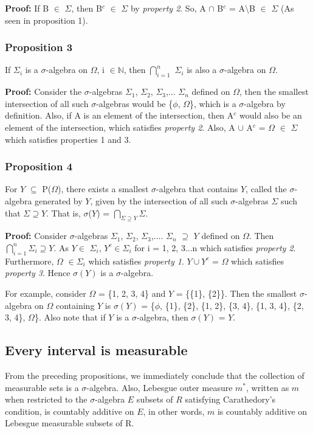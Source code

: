 \documentclass{article}
\begin{document}
\textbf{Proof: }If B $\in$ $\Sigma$, then B$^c$ $\in$ $\Sigma$ by  \textit{property 2}. So, A $\cap$ B$^c$ = A$\setminus$B $\in$ $\Sigma$ (As seen in proposition 1).


\subsubsection{Proposition 3}
If $\Sigma_i$ is a $\sigma$-algebra on $\Omega$, i $\in \mathbb{N}$, then $\bigcap\limits_{i=1}^n$ $\Sigma_i$ is also a $\sigma$-algebra on $\Omega$.\medskip

\textbf{Proof: }Consider the $\sigma$-algebras $\Sigma_1$, $\Sigma_2$, $\Sigma_3$,... $\Sigma_n$ defined on $\Omega$, then the smallest intersection of all such $\sigma$-algebras would be \{$\phi$, $\Omega$\}, which is a $\sigma$-algebra by definition. Also, if A is an element of the intersection, then A$^c$ would also be an element of the intersection, which satisfies \textit{property 2}. Also, A $\cup$ A$^c$ = $\Omega$ $\in$ $\Sigma$ which satisfies properties 1 and 3.



\subsubsection{Proposition 4}
For $Y$ $\subseteq$ P($\Omega$), there exists a smallest $\sigma$-algebra that contains $Y$, called the $\sigma$-algebra generated by $Y$, given by the intersection of all such $\sigma$-algebras $\Sigma$ such that $\Sigma \supseteq Y$. That is, $\sigma$($Y$) = $\bigcap\limits_{\Sigma \supseteq Y}\Sigma$.\bigskip

\textbf{Proof: }Consider $\sigma$-algebras $\Sigma_1$, $\Sigma_2$, $\Sigma_3$,....  $\Sigma_n$ $\supseteq $ $Y$ defined on $\Omega$. Then $\bigcap\limits_{i=1}^n \Sigma_i \supseteq Y$. As $Y \in$ $\Sigma_i$, $Y^c \in \Sigma_i$ for i = 1, 2, 3...n which satisfies \textit{property 2}. Furthermore, $\Omega$ $\in \Sigma_i$ which satisfies \textit{property 1}. $Y \cup Y^c$ = $\Omega$ which satisfies \textit{property 3}. Hence $\sigma(Y)$ is a $\sigma$-algebra.

For example, consider $\Omega$ = \{1, 2, 3, 4\} and $Y$ = \{\{1\}, \{2\}\}. Then the smallest $\sigma$-algebra on $\Omega$ containing $Y$ is $\sigma(Y)$ = \{$\phi$, \{1\}, \{2\}, \{1, 2\}, \{3, 4\}, \{1, 3, 4\}, \{2, 3, 4\}, $\Omega$\}. Also note that if $Y$ is a $\sigma$-algebra, then $\sigma(Y)$ = $Y$.

\subsection{Every interval is measurable}
From the preceding propositions, we immediately conclude that the collection of measurable sets is a $\sigma$-algebra. Also, Lebesgue outer measure $m^*$, written as $m$ when restricted to the $\sigma$-algebra $E$ subsets of $R$ satisfying Carathedory's condition, is countably additive on $E$, in other words, $m$ is countably additive on Lebesgue measurable subsets of R.
\medskip
\end{document}
